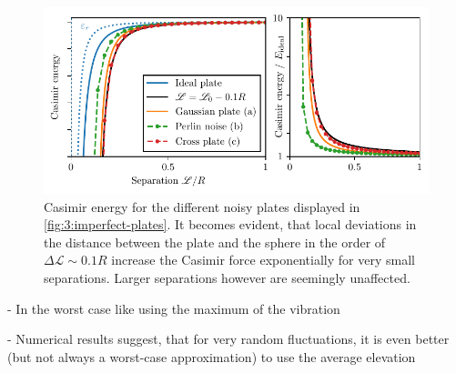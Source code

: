 \begin{figure}[!htbp]
  \centering
  \includegraphics[width=\textwidth]{../figures/casimir/casimir-potential-imperfect-plates-relative.pdf}
  \caption{Casimir energy for the different noisy plates displayed in \cref{fig:3:imperfect-plates}. It becomes evident, that local deviations in the distance between the plate and the sphere in the order of $\Delta \mathscr{L} \sim 0.1R$ increase the Casimir force exponentially for very small separations. Larger separations however are seemingly unaffected.}
  \label{fig:3:casimir-imperfect-plates}
\end{figure}




- In the worst case like using the maximum of the vibration

- Numerical results suggest, that for very random fluctuations, it is even better (but not always a worst-case approximation) to use the average elevation